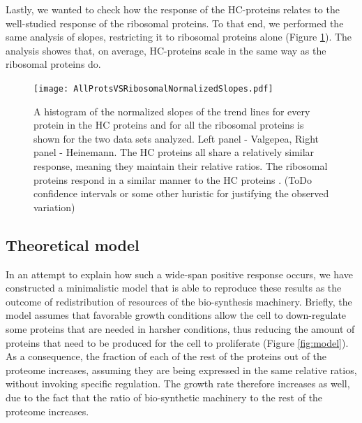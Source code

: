 \documentclass[notitlepage]{article}
\begin{document}
Lastly, we wanted to check how the response of the HC-proteins relates to the well-studied response of the ribosomal proteins.
To that end, we performed the same analysis of slopes, restricting it to ribosomal proteins alone (Figure \ref{fig:globalfit}).
The analysis showes that, on average, HC-proteins scale in the same way as the ribosomal proteins do.

\begin{figure}[h]
\centering
\texttt{[image: AllProtsVSRibosomalNormalizedSlopes.pdf]}
\caption{
    A histogram of the normalized slopes of the trend lines for every protein in the HC proteins and for all the ribosomal proteins is shown for the two data sets analyzed.
    Left panel - Valgepea, Right panel - Heinemann.
    The HC proteins all share a relatively similar response, meaning they maintain their relative ratios.
    The ribosomal proteins respond in a similar manner to the HC proteins .
    (ToDo confidence intervals or some other huristic for justifying the observed variation)
}
\label{fig:globalfit}
\end{figure}

\subsection{Theoretical model}
In an attempt to explain how such a wide-span positive response occurs, we have constructed a minimalistic model that is able to reproduce these results as the outcome of redistribution of resources of the bio-synthesis machinery.
Briefly, the model assumes that favorable growth conditions allow the cell to down-regulate some proteins that are needed in harsher conditions, thus reducing the amount of proteins that need to be produced for the cell to proliferate (Figure \ref{fig:model}).
As a consequence, the fraction of each of the rest of the proteins out of the proteome increases, assuming they are being expressed in the same relative ratios, without invoking specific regulation.
The growth rate therefore increases as well, due to the fact that the ratio of bio-synthetic machinery to the rest of the proteome increases.
\end{document}
